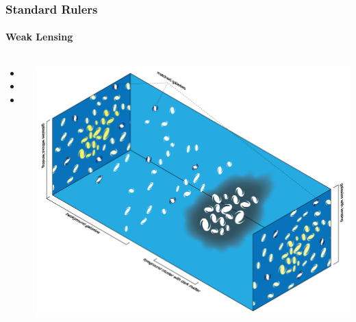 \documentclass[aspectratio=169]{beamer}
\begin{document}
\begin{frame}
    \frametitle{Standard Rulers}
    \framesubtitle{Weak Lensing}
    \begin{columns}
        \begin{itemize}
            \item <+DES+>
            \item <+KiDS+>
            \item <+HSC+>
        \end{itemize}
        \includegraphics[width=\textwidth]{figures/weak_lensing.png}
    \end{columns}
\end{frame}
\end{document}
